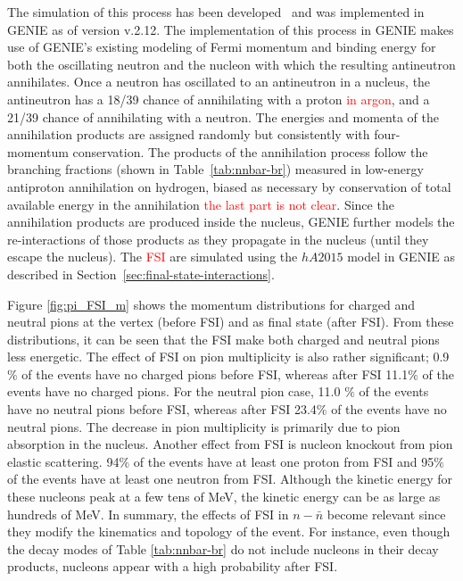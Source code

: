 The simulation of this process has been developed~\cite{Hewes:2017xtr} and was implemented in GENIE as of version v.2.12. The implementation of this process in GENIE makes use of GENIE's existing modeling of Fermi momentum and binding energy for both the oscillating neutron and the nucleon with which the resulting antineutron annihilates.   Once a neutron has oscillated to an antineutron in a nucleus, the antineutron has a 18/39 chance of annihilating with a proton \textcolor{red}{in argon}, and a 21/39 chance of annihilating with a neutron. The energies and momenta of the annihilation products are assigned randomly but consistently with four-momentum conservation. The products of the annihilation process follow the branching fractions (shown in Table~\ref{tab:nnbar-br}) measured in low-energy antiproton annihilation on hydrogen, biased as necessary by conservation of total available energy in the annihilation \textcolor{red}{the last part is not clear}. Since the annihilation products are produced inside the nucleus, GENIE further models the re-interactions of those products as they propagate in the nucleus (until they escape the nucleus).  The 
\textcolor{red}{FSI} are simulated using the $hA2015$ model in GENIE as described in Section~\ref{sec:final-state-interactions}.

Figure \ref{fig:pi_FSI_m} shows the momentum distributions for charged and neutral pions at the vertex (before FSI) and as final state (after FSI). From these distributions, it can be seen that the FSI make both charged and neutral pions less energetic.  The effect of FSI on pion multiplicity is also rather significant; 0.9$\%$ of the events have no charged pions before FSI, whereas after FSI 11.1$\%$ of the events have no charged pions. For the neutral pion case, 11.0 $\%$ of the events have no neutral pions before FSI, whereas after FSI 23.4$\%$ of the events have no neutral pions. The decrease in pion multiplicity is primarily due to pion absorption in the nucleus. Another effect from FSI is nucleon knockout from pion elastic scattering. 94$\%$ of the events have at least one proton from FSI and 95$\%$ of the events have at least one neutron from FSI. Although the kinetic energy for these nucleons peak at a few tens of MeV, the kinetic energy can be as large as hundreds of MeV.  In summary, the effects of FSI in $n-\bar{n}$ become relevant since they modify the kinematics and topology of the event. For instance, even though the decay modes of Table \ref{tab:nnbar-br} do not include nucleons in their decay products, nucleons appear with a high probability after FSI.

